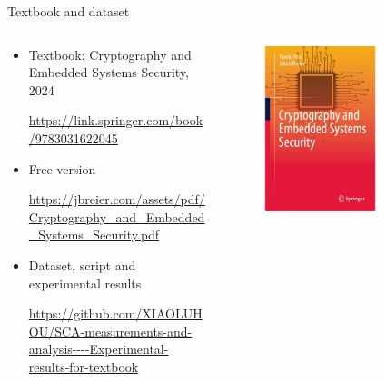 \documentclass[aspectratio=169]{beamer}
\begin{document}
\maketitle



\begin{frame}{Textbook and dataset}
    \begin{columns}[T] %
\begin{column}{.6\textwidth}
        \begin{itemize}
        \item Textbook: Cryptography and Embedded Systems Security, 2024
        \begin{center}
        \url{https://link.springer.com/book/9783031622045}
        \end{center}
        \item Free version
        \begin{center}
        \url{https://jbreier.com/assets/pdf/Cryptography_and_Embedded_Systems_Security.pdf}
        \end{center}
        \item Dataset, script and experimental results
        \begin{center}
            \url{https://github.com/XIAOLUHOU/SCA-measurements-and-analysis----Experimental-results-for-textbook}
        \end{center}
    \end{itemize}
\end{column}%
\hfill%
\begin{column}{.5\textwidth}
\begin{figure}
    \includegraphics[width=0.7\textwidth]{fig/Textbook.pdf}
\end{figure}
\end{column}%
\end{columns}
\end{frame}
\end{document}
